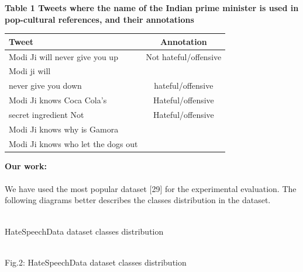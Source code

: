 \documentclass{letter}
\begin{document}
\begin{multicols}{2}
\begin{footnotesize}
\begin{center}
{\textbf{Table 1 Tweets where the name of the Indian prime minister is used 
in pop-cultural references, and their annotations}}
\begin{tabular}{|l|c|}
\hline
\textbf{Tweet} & \textbf{Annotation}\\[0.5ex]
\hline
Modi Ji will never give you up & Not hateful/offensive\\
Modi ji will &   \\
never give you down & hateful/offensive\\
Modi Ji knows Coca Cola’s & Hateful/offensive\\
secret ingredient Not & Hateful/offensive\\
Modi Ji knows why is Gamora &  \\
Modi Ji knows who let the dogs out &  \\
\hline
\end{tabular}
\end{center}
\end{footnotesize}
\textbf{Our work:}\\\\
We have used the most popular dataset [29] for the 
experimental evaluation. The following diagrams better 
describes the classes distribution in the dataset.\\ \\
\begin{scriptsize}
\begin{center}
HateSpeechData dataset classes distribution
\end{center}
\end{scriptsize}\\
Fig.2: HateSpeechData dataset classes distribution\\ \\ \\ \\ \\ \\ \\ \\ \\ \\ \\ \\ \\

\end{multicols}
\end{document}

